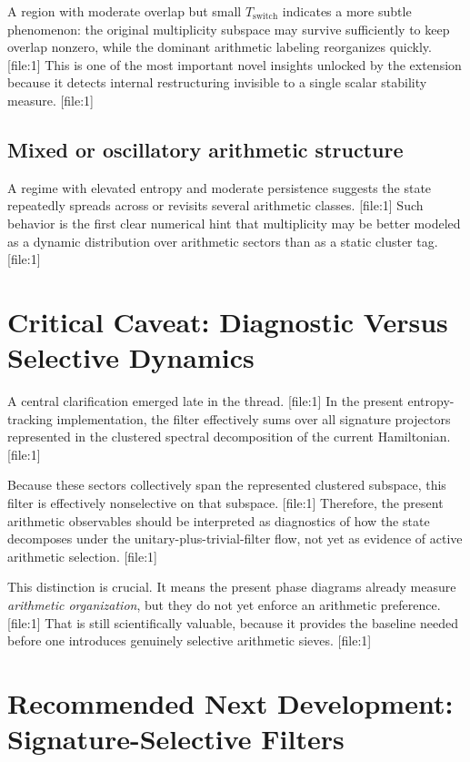 \documentclass[11pt]{article}
\begin{document}
A region with moderate overlap but small $T_{\mathrm{switch}}$ indicates a more subtle phenomenon: the original multiplicity subspace may survive sufficiently to keep overlap nonzero, while the dominant arithmetic labeling reorganizes quickly. [file:1] This is one of the most important novel insights unlocked by the extension because it detects internal restructuring invisible to a single scalar stability measure. [file:1]

\subsection{Mixed or oscillatory arithmetic structure}

A regime with elevated entropy and moderate persistence suggests the state repeatedly spreads across or revisits several arithmetic classes. [file:1] Such behavior is the first clear numerical hint that multiplicity may be better modeled as a dynamic distribution over arithmetic sectors than as a static cluster tag. [file:1]

\section{Critical Caveat: Diagnostic Versus Selective Dynamics}

A central clarification emerged late in the thread. [file:1] In the present entropy-tracking implementation, the filter effectively sums over all signature projectors represented in the clustered spectral decomposition of the current Hamiltonian. [file:1]

Because these sectors collectively span the represented clustered subspace, this filter is effectively nonselective on that subspace. [file:1] Therefore, the present arithmetic observables should be interpreted as diagnostics of how the state decomposes under the unitary-plus-trivial-filter flow, not yet as evidence of active arithmetic selection. [file:1]

This distinction is crucial. It means the present phase diagrams already measure \emph{arithmetic organization}, but they do not yet enforce an arithmetic preference. [file:1] That is still scientifically valuable, because it provides the baseline needed before one introduces genuinely selective arithmetic sieves. [file:1]

\section{Recommended Next Development: Signature-Selective Filters}
\end{document}
